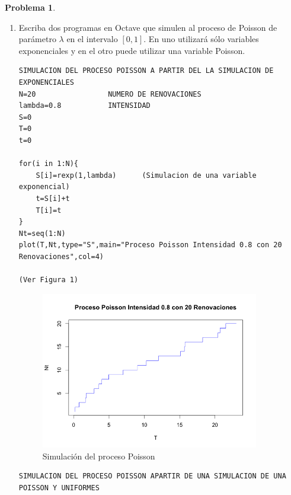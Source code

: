 \documentclass[a5paper,oneside]{amsart}
\theoremstyle{plain}
\theoremstyle{definition}
\newtheorem{problema}{Problema}
\begin{document}
\begin{problema}
\begin{enumerate}
\begin{proof}
$$
f_{Y_1\dots ,Y_{n-1}}(y_1,\ldots ,y_{n-1})=(n-1)!f_{Y_1}(y_1)\ldots f_{Y_{n-1}}(y_{n-1})\mathds{1}_{\set{y_1\leq y_2 \ldots \leq y_{n-1}}}
$$
Luego entonces si tenemos una muestra de tama\~no $n-1$ de una distribuci\'on uniforme$(0,t_n)$  tendr\'iamos que:
$$
f_{Y_1\dots ,Y_{n-1}}(y_1,\ldots ,y_{n-1})=\frac{(n-1)!}{t_n^{n-1}}
$$
Es decir tiene la misma densidad que  la  conjunta de $T_1,\ldots, T_{n-1}$ dado $T_n$. Por lo tanto concluimos que  $T_1,\ldots, T_{n-1}$ dado $T_n$ tiene la misma distribuci\'on  que la distribuci\'on conjunta de los estad\'isticos de orden de un muestra de tama\~no $n-1$ de una poblaci\'on uniforme $(0,t_n)$. Lo anterior nos indica entonces que $T_i$ dado $T_n$  con $0 < i < n$ tiene la misma distribuci\'on que el i-\'esimo estad\'istico de orden es decir:
$$
f_{T_i|T_n}(t_i |t_n)=i {n-1 \choose i}\paren{\frac{t_i}{t_n}}^{i-1}\paren{1-\frac{t_i}{t_n}}^{n-1-i}\frac{1}{t_n} \mathds{1}_{0\leq t_i \leq t_n}
$$

\end{proof}
\item Escriba dos programas en Octave que simulen al proceso de Poisson de par\'ametro $\lambda$ en el intervalo $[0,1]$. En uno utilizar\'a s\'olo variables exponenciales y en el otro puede utilizar una variable Poisson.\\
\begin{lstlisting}
SIMULACION DEL PROCESO POISSON A PARTIR DEL LA SIMULACION DE EXPONENCIALES 	
N=20        		 NUMERO DE RENOVACIONES
lambda=0.8  	     INTENSIDAD 
S=0         			
T=0         		
t=0         			

for(i in 1:N){
 	S[i]=rexp(1,lambda) 	 (Simulacion de una variable exponencial)
 	t=S[i]+t
 	T[i]=t
}
Nt=seq(1:N)
plot(T,Nt,type="S",main="Proceso Poisson Intensidad 0.8 con 20 Renovaciones",col=4)

(Ver Figura 1)
\end{lstlisting}
 \begin{figure}
  \centering
    \includegraphics[width=0.9\textwidth]{Poisson1.png}
  \caption{ Simulaci\'on del proceso Poisson}
  \label{fig:ejemplo1}
\end{figure}
\begin{lstlisting}
SIMULACION DEL PROCESO POISSON APARTIR DE UNA SIMULACION DE UNA POISSON Y UNIFORMES


\end{lstlisting}
\end{enumerate}
\end{problema}
\end{document}
